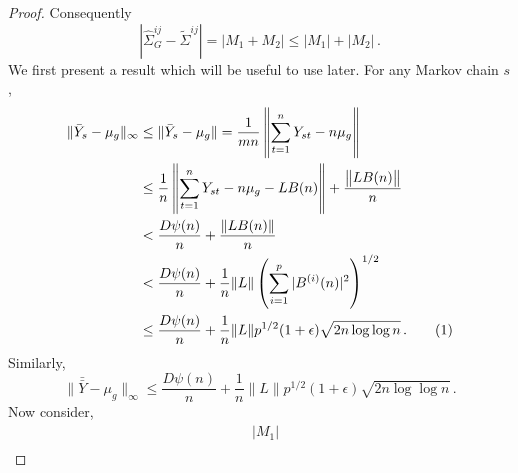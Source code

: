 \documentclass[11pt]{article}
\newcommand\numberthis{\addtocounter{equation}{1}\tag{\theequation}}
\theoremstyle{remark}
\begin{document}
\begin{proof}
Consequently
\[
\left|\hat{\Sigma}_{G}^{ij} - \tilde{\Sigma}^{ij}  \right| = |M_1 + M_2| \leq |M_1| + |M_2|\,.
\]
%
We first present a result which will be useful to use later. For any Markov chain $s$, 
\begin{align*}
  \|\bar{Y}_s - \mu_g\|_{\infty} & \leq \|\bar{Y}_s - \mu_g\| = \dfrac{1}{mn}\left\|\sum_{t=1}^{n}Y_{st} - n\mu_g\right\| \\
  & \leq \dfrac{1}{n}\left\|\sum_{t=1}^{n}Y_{st} - n \mu_g - L B(n)\right\| + \dfrac{\left\|L B(n)\right\|}{n}\\
  &< \dfrac{D\psi(n)}{n} + \dfrac{\|L B(n)\|}{n}\\
  &< \dfrac{D\psi(n)}{n} + \dfrac{1}{n}\|L\| \left(\sum\limits_{i=1}^{p}|B^{(i)}(n)|^2\right)^{1/2}\\
  & \leq \dfrac{D\psi(n)}{n} + \dfrac{1}{n}\|L\| p^{1/2}(1+\epsilon)\sqrt{2n \log\log n}\,. \numberthis \label{eq:xbars_bound}
\end{align*}
 Similarly,
 \begin{equation}
\label{eq:xbarbar_bound}
   \| \bar{\bar{Y}} - \mu_g\|_{\infty} \leq \dfrac{D\psi(n)}{n} + \dfrac{1}{n}\|L\| p^{1/2}(1+\epsilon)\sqrt{2n \log\log n}\,.
\end{equation}
%
Now consider,
\begin{align*}
& |M_1| \\ 

\end{align*}
\end{proof}
\end{document}
